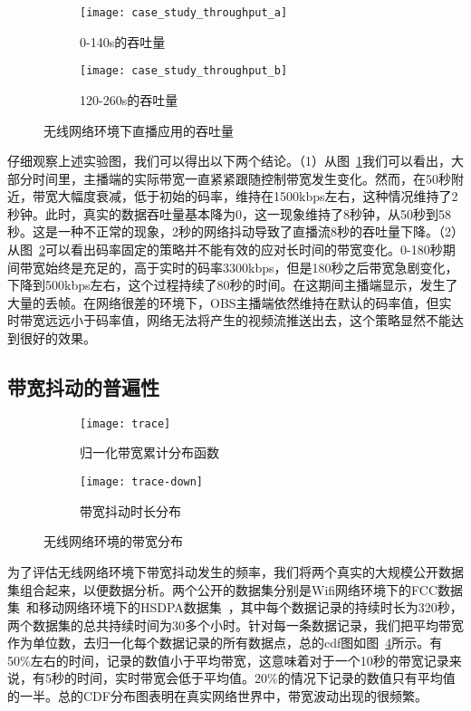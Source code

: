 \begin{figure}[h]
  \centering%
  \begin{subfigure}{0.49\textwidth}
    \texttt{[image: case\_study\_throughput\_a]}
    \caption{0-140s的吞吐量}
    \label{fig:case_study_a}
  \end{subfigure}%
  \hfill
  \begin{subfigure}{0.49\textwidth}
    \texttt{[image: case\_study\_throughput\_b]}
    \caption{120-260s的吞吐量}
    \label{fig:case_study_b}
  \end{subfigure}
  \vspace{0.1in}
  \caption{无线网络环境下直播应用的吞吐量}
  \label{fig:case_study}
\end{figure}

仔细观察上述实验图，我们可以得出以下两个结论。（1）从图~\ref{fig:case_study_a}我们可以看出，大部分时间里，主播端的实际带宽一直紧紧跟随控制带宽发生变化。然而，在50秒附近，带宽大幅度衰减，低于初始的码率，维持在1500kbps左右，这种情况维持了2秒钟。此时，真实的数据吞吐量基本降为0，这一现象维持了8秒钟，从50秒到58秒。这是一种不正常的现象，2秒的网络抖动导致了直播流8秒的吞吐量下降。（2）从图~\ref{fig:case_study_b}可以看出码率固定的策略并不能有效的应对长时间的带宽变化。0-180秒期间带宽始终是充足的，高于实时的码率3300kbps，但是180秒之后带宽急剧变化，下降到500kbps左右，这个过程持续了80秒的时间。在这期间主播端显示，发生了大量的丢帧。在网络很差的环境下，OBS主播端依然维持在默认的码率值，但实时带宽远远小于码率值，网络无法将产生的视频流推送出去，这个策略显然不能达到很好的效果。

\subsection{带宽抖动的普遍性}
\begin{figure}[h]
  \centering%
  \begin{subfigure}{0.49\textwidth}
    \texttt{[image: trace]}
    \caption{归一化带宽累计分布函数}
    \label{fig:trace}
  \end{subfigure}%
  \hfill
  \begin{subfigure}{0.49\textwidth}
    \texttt{[image: trace-down]}
    \caption{带宽抖动时长分布}
    \label{fig:trace_down}
  \end{subfigure}
  \vspace{0.1in}
  \caption{无线网络环境的带宽分布}
  \label{fig:case_study}
\end{figure}

为了评估无线网络环境下带宽抖动发生的频率，我们将两个真实的大规模公开数据集组合起来，以便数据分析。两个公开的数据集分别是Wifi网络环境下的FCC数据集~\cite{FCC}和移动网络环境下的HSDPA数据集~\cite{riiser2013commute}，其中每个数据记录的持续时长为320秒，两个数据集的总共持续时间为30多个小时。针对每一条数据记录，我们把平均带宽作为单位数，去归一化每个数据记录的所有数据点，总的cdf图如图~\ref{fig:trace}所示。有50\%左右的时间，记录的数值小于平均带宽，这意味着对于一个10秒的带宽记录来说，有5秒的时间，实时带宽会低于平均值。20\%的情况下记录的数值只有平均值的一半。总的CDF分布图表明在真实网络世界中，带宽波动出现的很频繁。


